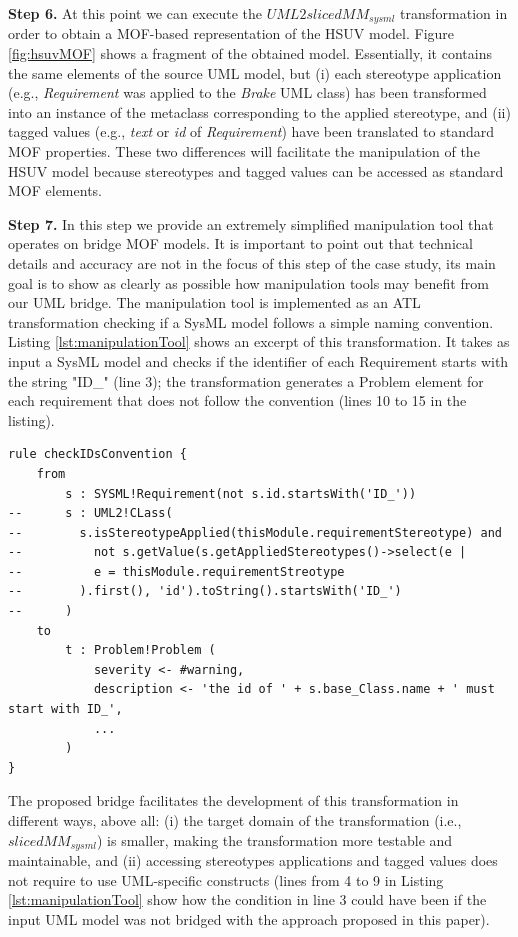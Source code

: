 %
\textbf{Step 6.} At this point we can execute the $UML2slicedMM_{sysml}$ transformation in order to obtain a MOF-based representation
of the HSUV model. Figure \ref{fig:hsuvMOF} shows a fragment of the obtained model. 
Essentially, it contains the same elements of the source UML model, but (i) each stereotype application (e.g., \textit{Requirement}
was applied to the \textit{Brake} UML class)
has been transformed into an instance of the metaclass corresponding to the applied stereotype,
and (ii) tagged values (e.g., \textit{text} or \textit{id} of \textit{Requirement}) 
have been translated to standard MOF properties. These two differences will facilitate
the manipulation of the HSUV model because stereotypes and tagged values can be accessed as standard MOF elements.

\textbf{Step 7.} In this step we provide an extremely simplified manipulation tool that operates on bridge MOF models. 
It is important to point out that technical details and accuracy are not in the focus of this step of the case study, 
its main goal is to show as clearly as possible how manipulation tools may benefit from our UML bridge. 
The manipulation tool is implemented as an ATL transformation checking if a SysML model follows a simple naming convention.
Listing \ref{lst:manipulationTool} shows an excerpt of this transformation.
It takes as input a SysML model and checks if the identifier of each Requirement starts with the string "ID\_" (line 3);
the transformation generates a Problem element for each requirement that does not follow the convention (lines 10 to 15 in the listing).
%
\begin{lstlisting}[breaklines,style=AMMA,language=ATL,mathescape,rulesepcolor=\color{black},caption=ATL transformation manipulating SysML models,captionpos=b,label={lst:manipulationTool}]
rule checkIDsConvention {
	from
		s : SYSML!Requirement(not s.id.startsWith('ID_'))
--		s : UML2!CLass(
--		  s.isStereotypeApplied(thisModule.requirementStereotype) and 
--			not s.getValue(s.getAppliedStereotypes()->select(e |
--			e = thisModule.requirementStreotype
--		  ).first(), 'id').toString().startsWith('ID_')
--		)		
	to
		t : Problem!Problem (
			severity <- #warning,
			description <- 'the id of ' + s.base_Class.name + ' must start with ID_',
			...
		)
}
\end{lstlisting}

The proposed bridge facilitates
the development of this transformation in different ways, above all: 
(i) the target domain of the transformation (i.e., $slicedMM_{sysml}$) is smaller, 
making the transformation more testable and maintainable, and 
(ii) accessing stereotypes applications and tagged values 
does not require to use UML-specific constructs (lines from 4 to 9 in Listing \ref{lst:manipulationTool} 
show how the condition in line 3 could have been if the input UML model was not bridged with the approach
proposed in this paper).

